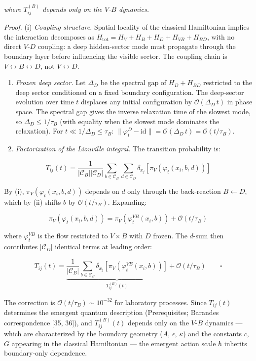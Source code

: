 \documentclass[
]{article}
\begin{document}
\emph{where \(T^{(B)}_{ij}\) depends only on the \(V\)-\(B\) dynamics.}

\emph{Proof.} (i) \emph{Coupling structure.} Spatial locality of the
classical Hamiltonian implies the interaction decomposes as
\(H_{\text{tot}} = H_V + H_B + H_D + H_{VB} + H_{BD}\), with no direct
\(V\)-\(D\) coupling: a deep hidden-sector mode must propagate through
the boundary layer before influencing the visible sector. The coupling
chain is \(V \leftrightarrow B \leftrightarrow D\), not
\(V \leftrightarrow D\).

\begin{enumerate}
\def\labelenumi{(\roman{enumi})}
\setcounter{enumi}{1}
\item
  \emph{Frozen deep sector.} Let \(\Delta_D\) be the spectral gap of
  \(H_D + H_{BD}\) restricted to the deep sector conditioned on a fixed
  boundary configuration. The deep-sector evolution over time \(t\)
  displaces any initial configuration by \(\mathcal{O}(\Delta_D \, t)\)
  in phase space. The spectral gap gives the inverse relaxation time of
  the slowest mode, so \(\Delta_D \leq 1/\tau_B\) (with equality when
  the slowest mode dominates the relaxation). For
  \(t \ll 1/\Delta_D \leq \tau_B\):
  \(\|\varphi_t^D - \text{id}\| = \mathcal{O}(\Delta_D \, t) = \mathcal{O}(t/\tau_B)\).
\item
  \emph{Factorization of the Liouville integral.} The transition
  probability is:
\end{enumerate}

\[T_{ij}(t) = \frac{1}{|\mathcal{C}_B||\mathcal{C}_D|} \sum_{b \in \mathcal{C}_B} \sum_{d \in \mathcal{C}_D} \delta_{x_j}[\pi_V(\varphi_t(x_i, b, d))]\]

By (i), \(\pi_V(\varphi_t(x_i, b, d))\) depends on \(d\) only through
the back-reaction \(B \leftarrow D\), which by (ii) shifts \(b\) by
\(\mathcal{O}(t/\tau_B)\). Expanding:

\[\pi_V(\varphi_t(x_i, b, d)) = \pi_V(\varphi_t^{VB}(x_i, b)) + \mathcal{O}(t/\tau_B)\]

where \(\varphi_t^{VB}\) is the flow restricted to \(V \times B\) with
\(D\) frozen. The \(d\)-sum then contributes \(|\mathcal{C}_D|\)
identical terms at leading order:

\[T_{ij}(t) = \underbrace{\frac{1}{|\mathcal{C}_B|} \sum_{b \in \mathcal{C}_B} \delta_{x_j}[\pi_V(\varphi_t^{VB}(x_i, b))]}_{T^{(B)}_{ij}(t)} + \mathcal{O}(t/\tau_B) \qquad \square\]

The correction is \(\mathcal{O}(t/\tau_B) \sim 10^{-32}\) for laboratory
processes. Since \(T_{ij}(t)\) determines the emergent quantum
description (Prerequisites; Barandes correspondence {[}35, 36{]}), and
\(T^{(B)}_{ij}(t)\) depends only on the \(V\)-\(B\) dynamics --- which
are characterized by the boundary geometry (\(A\), \(\epsilon\),
\(\kappa\)) and the constants \(c\), \(G\) appearing in the classical
Hamiltonian --- the emergent action scale \(\hbar\) inherits
boundary-only dependence.
\end{document}
